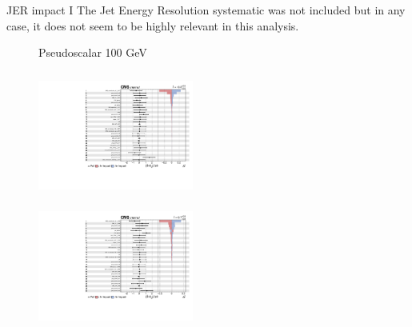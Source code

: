 \documentclass[8pt]{beamer}
\begin{document}
\begin{frame}{JER impact I}
\justifying
The Jet Energy Resolution systematic was not included but in any case, it does not seem to be highly relevant in this analysis. \vfill

\begin{figure}[htbp]
\centering
\begin{block}{\centering Pseudoscalar 100 GeV}\end{block}	\vspace{-8pt}

\begin{minipage}[b]{0.49\textwidth}
\begin{center}
\centering \begin{block}{}\end{block}	
\includegraphics[width=5.1cm, height=4.2cm]{figs/impacts_jer/impacts_2017_both_pseudo_100.pdf}
\end{center}
\end{minipage}\hfill
\begin{minipage}[b]{0.49\textwidth}
\begin{center}
\centering \begin{block}{}\end{block}	
\includegraphics[width=5.1cm, height=4.2cm]{figs/impacts_jer/impacts_2018_both_pseudo_100.pdf}
\end{center}
\end{minipage} \hfill
\end{figure} \vfill

\end{frame}
\end{document}
